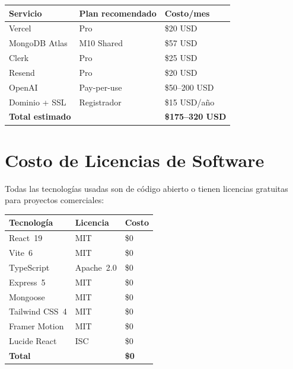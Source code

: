 \documentclass[12pt, a4paper, twoside]{report}
\begin{document}
\begin{center}
\begin{tabular}{L{4.5cm} L{3.5cm} C{3cm}}
  \toprule
  \textbf{Servicio} & \textbf{Plan recomendado} & \textbf{Costo/mes} \\
  \midrule
  Vercel          & Pro        & \$20 USD \\
  MongoDB Atlas   & M10 Shared & \$57 USD \\
  Clerk           & Pro        & \$25 USD \\
  Resend          & Pro        & \$20 USD \\
  OpenAI          & Pay-per-use& \$50--200 USD \\
  Dominio + SSL   & Registrador& \$15 USD/año \\
  \midrule
  \textbf{Total estimado} & & \textbf{\$175--320 USD} \\
  \bottomrule
\end{tabular}
\end{center}

\section{Costo de Licencias de Software}

Todas las tecnologías usadas son de código abierto o tienen licencias gratuitas para proyectos
comerciales:

\begin{center}
\begin{tabular}{L{4cm} L{3cm} C{2cm}}
  \toprule
  \textbf{Tecnología} & \textbf{Licencia} & \textbf{Costo} \\
  \midrule
  React~19        & MIT        & \$0 \\
  Vite~6          & MIT        & \$0 \\
  TypeScript      & Apache~2.0 & \$0 \\
  Express~5       & MIT        & \$0 \\
  Mongoose        & MIT        & \$0 \\
  Tailwind CSS~4  & MIT        & \$0 \\
  Framer Motion   & MIT        & \$0 \\
  Lucide React    & ISC        & \$0 \\
  \midrule
  \textbf{Total} & & \textbf{\$0} \\
  \bottomrule
\end{tabular}
\end{center}

\clearpage
\end{document}
